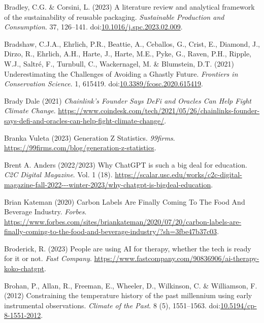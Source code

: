 \documentclass[
  letterpaper,
  DIV=11,
  numbers=noendperiod]{scrartcl}
\newlength{\cslhangindent}
\newenvironment{CSLReferences}[2] %
 {\begin{list}{}{%
  \setlength{\itemindent}{0pt}
  \setlength{\leftmargin}{0pt}
  \setlength{\parsep}{0pt}
  \ifodd #1
   \setlength{\leftmargin}{\cslhangindent}
   \setlength{\itemindent}{-1\cslhangindent}
  \fi
  \setlength{\itemsep}{#2\baselineskip}}}
 {\end{list}}
\begin{document}
\begin{CSLReferences}{0}{1}
Bradley, C.G. \& Corsini, L. (2023) A literature review and analytical
framework of the sustainability of reusable packaging. \emph{Sustainable
Production and Consumption}. 37, 126--141.
doi:\href{https://doi.org/10.1016/j.spc.2023.02.009}{10.1016/j.spc.2023.02.009}.

Bradshaw, C.J.A., Ehrlich, P.R., Beattie, A., Ceballos, G., Crist, E.,
Diamond, J., Dirzo, R., Ehrlich, A.H., Harte, J., Harte, M.E., Pyke, G.,
Raven, P.H., Ripple, W.J., Saltré, F., Turnbull, C., Wackernagel, M. \&
Blumstein, D.T. (2021) Underestimating the {Challenges} of {Avoiding} a
{Ghastly Future}. \emph{Frontiers in Conservation Science}. 1, 615419.
doi:\href{https://doi.org/10.3389/fcosc.2020.615419}{10.3389/fcosc.2020.615419}.

Brady Dale (2021) \emph{Chainlink's {Founder Says DeFi} and {Oracles Can
Help Fight Climate Change}}.
\url{https://www.coindesk.com/tech/2021/05/26/chainlinks-founder-says-defi-and-oracles-can-help-fight-climate-change/}.

Branka Vuleta (2023) Generation {Z Statistics}. \emph{99firms}.
\url{https://99firms.com/blog/generation-z-statistics}.

Brent A. Anders (2022/2023) Why {ChatGPT} is such a big deal for
education. \emph{C2C Digital Magazine}. Vol. 1 (18).
\url{https://scalar.usc.edu/works/c2c-digital-magazine-fall-2022---winter-2023/why-chatgpt-is-bigdeal-education}.

Brian Kateman (2020) Carbon {Labels Are Finally Coming To The Food And
Beverage Industry}. \emph{Forbes}.
\url{https://www.forbes.com/sites/briankateman/2020/07/20/carbon-labels-are-finally-coming-to-the-food-and-beverage-industry/?sh=3fbe47b37c03}.

Broderick, R. (2023) People are using {AI} for therapy, whether the tech
is ready for it or not. \emph{Fast Company}.
\url{https://www.fastcompany.com/90836906/ai-therapy-koko-chatgpt}.

Brohan, P., Allan, R., Freeman, E., Wheeler, D., Wilkinson, C. \&
Williamson, F. (2012) Constraining the temperature history of the past
millennium using early instrumental observations. \emph{Climate of the
Past}. 8 (5), 1551--1563.
doi:\href{https://doi.org/10.5194/cp-8-1551-2012}{10.5194/cp-8-1551-2012}.


\end{CSLReferences}
\end{document}
